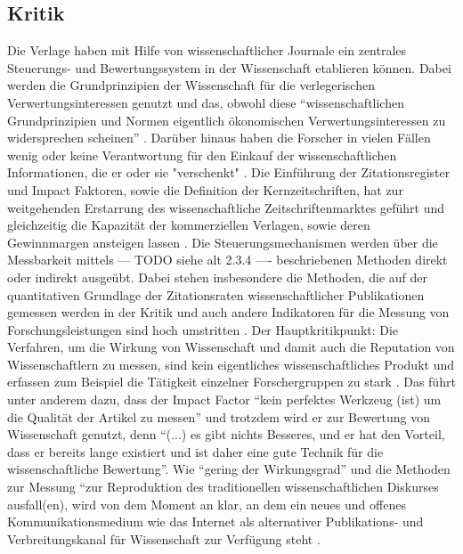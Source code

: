 \subsection{Kritik}
Die Verlage haben mit Hilfe von wissenschaftlicher Journale ein zentrales Steuerungs- und Bewertungssystem in der Wissenschaft etablieren können. Dabei werden die Grundprinzipien der Wissenschaft für die verlegerischen Verwertungsinteressen genutzt und das, obwohl diese “wissenschaftlichen Grundprinzipien und Normen eigentlich ökonomischen Verwertungsinteressen zu widersprechen scheinen” \cite{hanekop_2006}. Darüber hinaus haben die Forscher in vielen Fällen wenig oder keine Verantwortung für den Einkauf der wissenschaftlichen Informationen, die er oder sie "verschenkt" \cite{steele_2006}. Die Einführung der Zitationsregister und Impact Faktoren, sowie die Definition der Kernzeitschriften, hat zur weitgehenden Erstarrung des wissenschaftliche Zeitschriftenmarktes geführt und gleichzeitig die Kapazität der kommerziellen Verlagen, sowie deren Gewinnmargen ansteigen lassen \cite{CREATe_2014}. Die Steuerungsmechanismen werden über die Messbarkeit mittels --- TODO siehe alt 2.3.4 ---- beschriebenen Methoden direkt oder indirekt ausgeübt. Dabei stehen insbesondere die Methoden, die auf der quantitativen Grundlage der Zitationsraten wissenschaftlicher Publikationen gemessen werden in der Kritik \cite{Dong_2005} und auch andere Indikatoren für die Messung von Forschungsleistungen sind hoch umstritten \cite{Hornbostel_1997} \cite{Hicks_1996} \cite{Havemann_2002}. Der Hauptkritikpunkt: Die Verfahren, um die Wirkung von Wissenschaft und damit auch die Reputation von Wissenschaftlern zu messen, sind kein eigentliches wissenschaftliches Produkt\cite{suchen} und erfassen zum Beispiel die Tätigkeit einzelner Forschergruppen zu stark \cite{schmoch_2009}. Das führt unter anderem dazu, dass der Impact Factor “kein perfektes Werkzeug (ist) um die Qualität der Artikel zu messen” und trotzdem wird er zur Bewertung von Wissenschaft genutzt, denn “(...) es gibt nichts Besseres, und er hat den Vorteil, dass er bereits lange existiert und ist daher eine gute Technik für die wissenschaftliche Bewertung”\cite{garfield_1999}. Wie “gering der Wirkungsgrad” und die Methoden zur Messung “zur Reproduktion des traditionellen wissenschaftlichen Diskurses ausfall(en), wird von dem Moment an klar, an dem ein neues und offenes Kommunikationsmedium wie das Internet als alternativer Publikations- und Verbreitungskanal für Wissenschaft zur Verfügung steht \cite{Rost_1998}. 

